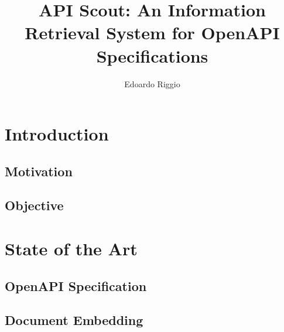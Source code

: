 \documentclass{layout/si-msc-proposal}
\author{Edoardo Riggio}
\title{API Scout: An Information Retrieval System for OpenAPI Specifications}
\begin{document}
    \maketitle


    \tableofcontents
    \listoffigures
    \listoftables
    \newpage


    \section{Introduction}\label{sec:introduction}
    

    \subsection{Motivation}\label{subsec:motivation}
    

    \subsection{Objective}\label{subsec:objective}
    


    \section{State of the Art}\label{sec:state-of-the-art}

    \subsection{OpenAPI Specification}\label{subsec:openapi-specification}
    

    \subsection{Document Embedding}\label{subsec:document-embedding}
    
\end{document}
